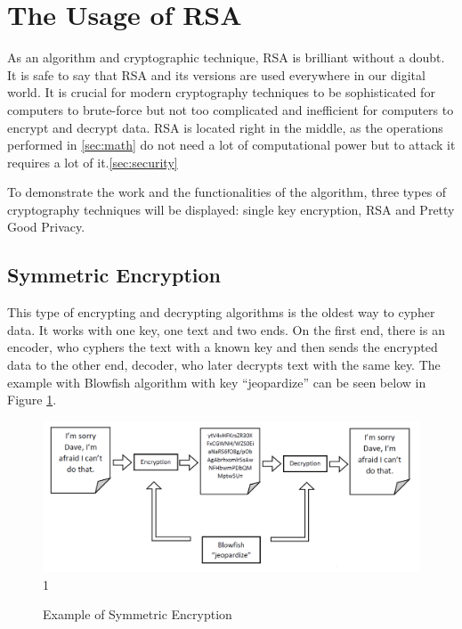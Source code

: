 \documentclass[a4paper, 12pt]{article}
\begin{document}
\section{The Usage of RSA}
\label{sec:usage}

As an algorithm and cryptographic technique, RSA is brilliant without a doubt. It is safe to say
that RSA and its versions are used everywhere in our digital world. It is crucial for modern
cryptography techniques to be sophisticated for computers to brute-force but not too complicated
and inefficient for computers to encrypt and decrypt data. RSA is located right in the middle, as
the operations performed in \ref{sec:math} do not need a lot of computational power but to attack it requires a lot of it.\ref{sec:security}

To demonstrate the work and the functionalities of the algorithm, three types of cryptography techniques will be displayed:
single key encryption, RSA and Pretty Good Privacy.

\subsection{Symmetric Encryption}
\label{bsec:symmetry}

This type of encrypting and decrypting algorithms is the oldest way to cypher data. It works with
one key, one text and two ends. On the first end, there is an encoder, who cyphers the text with a
known key and then sends the encrypted data to the other end, decoder, who later decrypts text
with the same key. The example with Blowfish\cite{blowfish} algorithm with key
“jeopardize” can be seen below in Figure \ref{fig:symmetric}.

\begin{figure}[ht]
  \begin{center}
    \includegraphics[width=\textwidth]{symmetric.png}1
    \caption{Example of Symmetric Encryption}
    \label{fig:symmetric}
    \end{center}
  \end{figure}
\end{document}
